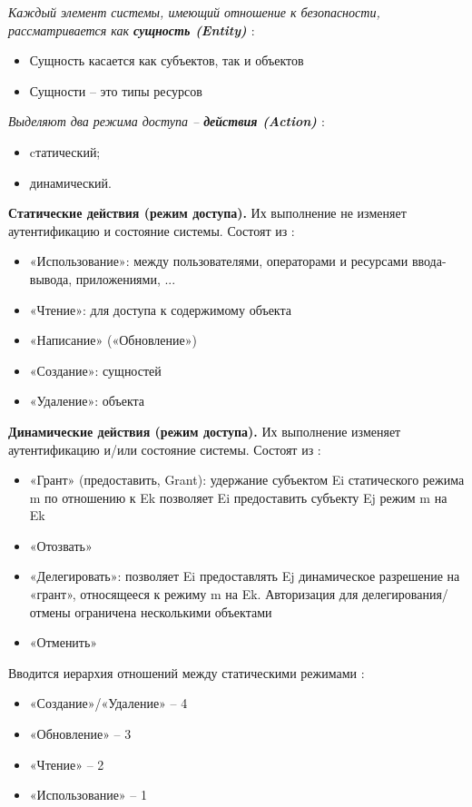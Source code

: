 \textit{Каждый элемент системы, имеющий отношение к безопасности, рассматривается как \textbf{сущность (Entity)} \autocite{Jalili}}:
\begin{itemize}
    \item Сущность касается как субъектов, так и объектов
    \item Сущности -- это типы ресурсов
\end{itemize}

\textit{Выделяют два режима доступа -- \textbf{действия (Action)} \autocite{Jalili}}:
\begin{itemize}
    \item cтатический;
    \item динамический.
\end{itemize}

\textbf{Статические действия (режим доступа).} Их выполнение не изменяет аутентификацию и состояние системы.
Состоят из \autocite{SecModels}:
\begin{itemize}
    \item «Использование»: между пользователями, операторами и ресурсами ввода-вывода, приложениями, ...
    \item «Чтение»: для доступа к содержимому объекта
    \item «Написание» («Обновление»)
    \item «Создание»: сущностей
    \item «Удаление»: объекта
\end{itemize}

\textbf{Динамические действия (режим доступа).} Их выполнение изменяет аутентификацию и/или состояние системы.
Состоят из \autocite{SecModels}:
\begin{itemize}
    \item «Грант» (предоставить, Grant): удержание субъектом Ei статического режима m по отношению к Ek 
    позволяет Ei предоставить субъекту Ej режим m на Ek
    \item «Отозвать»
    \item «Делегировать»: позволяет Ei предоставлять Ej динамическое разрешение на «грант», относящееся к режиму m 
    на Ek. Авторизация для делегирования/отмены ограничена несколькими объектами
    \item «Отменить»
\end{itemize}

Вводится иерархия отношений между статическими режимами \autocite{Jalili}:
\begin{itemize}
    \item «Создание»/«Удаление» -- 4
    \item «Обновление» -- 3
    \item «Чтение» -- 2
    \item «Использование» -- 1
\end{itemize}

